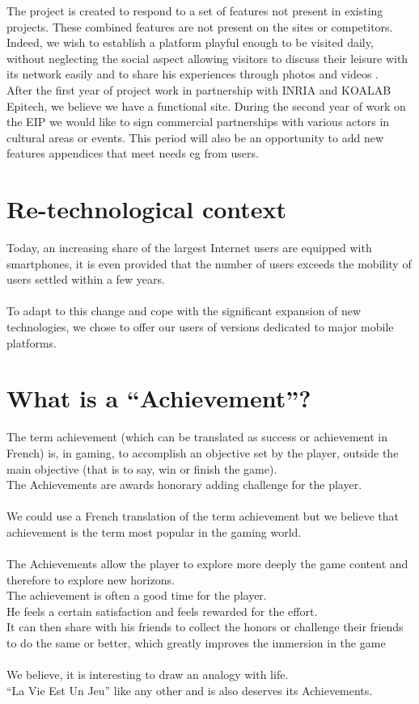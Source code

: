 \documentclass {life-en}
\begin{document}
The project is created to respond to a set of features not present in existing projects. These combined features are not present on the sites or competitors. Indeed, we wish to establish a platform playful enough to be visited daily, without neglecting the social aspect allowing visitors to discuss their leisure with its network easily and to share his experiences through photos and videos .\\

After the first year of project work in partnership with INRIA and KOALAB Epitech, we believe we have a functional site. During the second year of work on the EIP we would like to sign commercial partnerships with various actors in cultural areas or events. This period will also be an opportunity to add new features appendices that meet needs eg from users.

\newpage

\section{Re-technological context}

Today, an increasing share of the largest Internet users are equipped with smartphones, it is even provided that the number of users exceeds the mobility of users settled within a few years.\\
\\
To adapt to this change and cope with the significant expansion of new technologies, we chose to offer our users of versions dedicated to major mobile platforms.

\section{What is a ``Achievement''?}
The term achievement (which can be translated as success or achievement in French) is, in gaming, to accomplish an objective set by the player, outside the main objective (that is to say, win or finish the game).\\
The Achievements are awards honorary adding challenge for the player.\\
\\
We could use a French translation of the term achievement but we believe that achievement is the term most popular in the gaming world.\\
\\
The Achievements allow the player to explore more deeply the game content and therefore to explore new horizons.\\
The achievement is often a good time for the player.\\
He feels a certain satisfaction and feels rewarded for the effort.\\
It can then share with his friends to collect the honors or challenge their friends to do the same or better, which greatly improves the immersion in the game \\
\\
We believe, it is interesting to draw an analogy with life.\\
``La Vie Est Un Jeu'' like any other and is also deserves its Achievements.
\end{document}
